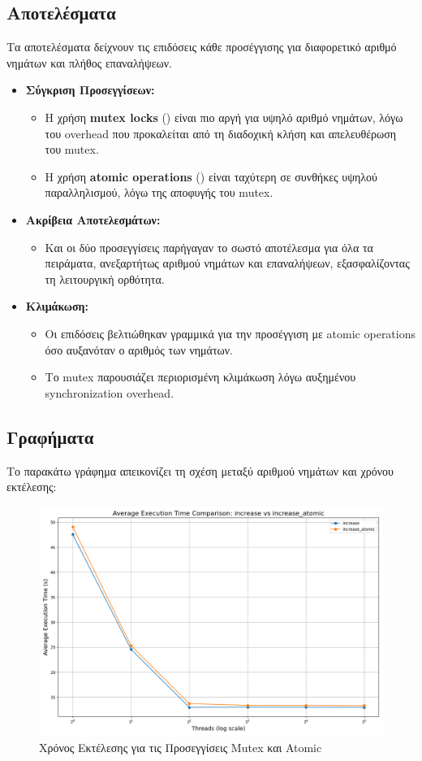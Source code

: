 \documentclass{article}
\begin{document}
\subsection*{Αποτελέσματα}
Τα αποτελέσματα δείχνουν τις επιδόσεις κάθε προσέγγισης για διαφορετικό αριθμό νημάτων και πλήθος επαναλήψεων.
\begin{itemize} 
    \item \textbf{Σύγκριση Προσεγγίσεων:} 
    \begin{itemize} 
        \item Η χρήση \textbf{mutex locks} () είναι πιο αργή για υψηλό αριθμό νημάτων, λόγω του overhead που προκαλείται από τη διαδοχική κλήση και απελευθέρωση του mutex. 
        \item Η χρήση \textbf{atomic operations} () είναι ταχύτερη σε συνθήκες υψηλού παραλληλισμού, λόγω της αποφυγής του mutex. 
    \end{itemize} 
    \item \textbf{Ακρίβεια Αποτελεσμάτων:} 
    \begin{itemize} 
        \item Και οι δύο προσεγγίσεις παρήγαγαν το σωστό αποτέλεσμα για όλα τα πειράματα, ανεξαρτήτως αριθμού νημάτων και επαναλήψεων, εξασφαλίζοντας τη λειτουργική ορθότητα. 
    \end{itemize} 
    \item \textbf{Κλιμάκωση:} 
    \begin{itemize} 
        \item Οι επιδόσεις βελτιώθηκαν γραμμικά για την προσέγγιση με atomic operations όσο αυξανόταν ο αριθμός των νημάτων. 
        \item Το mutex παρουσιάζει περιορισμένη κλιμάκωση λόγω αυξημένου synchronization overhead. 
    \end{itemize} 
\end{itemize}

\subsection*{Γραφήματα}
Το παρακάτω γράφημα απεικονίζει τη σχέση μεταξύ αριθμού νημάτων και χρόνου εκτέλεσης:
\begin{figure}[h] 
    \centering 
    \includegraphics[width=1\textwidth]{increase_results.png} 
    \caption{Χρόνος Εκτέλεσης για τις Προσεγγίσεις Mutex και Atomic} 
\end{figure}
\end{document}

